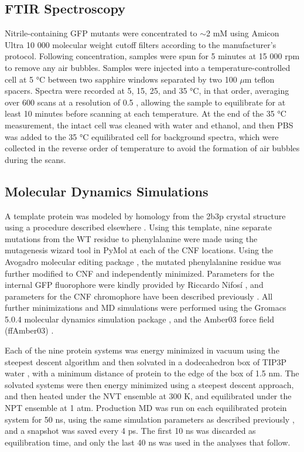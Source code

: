 \subsection{FTIR Spectroscopy}

Nitrile-containing GFP mutants were concentrated to $\sim$2 mM using Amicon Ultra 10 000 molecular weight cutoff filters according to the manufacturer's protocol.
Following concentration, samples were spun for 5 minutes at 15 000 rpm to remove any air bubbles.
Samples were injected into a temperature-controlled cell at 5 \si{\celsius} between two sapphire windows separated by two 100 $\mu$m teflon spacers.
Spectra were recorded at 5, 15, 25, and 35 \si{\celsius}, in that order, averaging over 600 scans at a resolution of 0.5 \si{\wn}, allowing the sample to equilibrate for at least 10 minutes before scanning at each temperature.
At the end of the 35 \si{\celsius} measurement, the intact cell was cleaned with water and ethanol, and then PBS was added to the 35 \si{\celsius} equilibrated cell for background spectra, which were collected in the reverse order of temperature to avoid the formation of air bubbles during the scans.

\subsection{Molecular Dynamics Simulations}

A template protein was modeled by homology from the 2b3p crystal structure\cite{Pedelacq2006} using a procedure described elsewhere \cite{Slocum2017}.
Using this template, nine separate mutations from the WT residue to phenylalanine were made using the mutagenesis wizard tool in PyMol\cite{DeLano2002} at each of the CNF locations.
Using the Avogadro molecular editing package \cite{Hanwell2012}, the mutated phenylalanine residue was further modified to CNF and independently minimized.
Parameters for the internal GFP fluorophore were kindly provided by Riccardo Nifos\'i \cite{Nifosi2003}, and parameters for the CNF chromophore have been described previously \cite{Slocum2017}.
All further minimizations and MD simulations were performed using the Gromacs 5.0.4 molecular dynamics simulation package \cite{VanDerSpoel2005, Abraham2015}, and the Amber03 force field (ffAmber03) \cite{Duan2003, Sorin2005}. 

Each of the nine protein systems was energy minimized in vacuum using the steepest descent algorithm and then solvated in a dodecahedron box of TIP3P water \cite{Jorgensen1983}, with a minimum distance of protein to the edge of the box of 1.5 nm.
The solvated systems were then energy minimized using a steepest descent approach, and then heated under the NVT ensemble at 300 K, and equilibrated under the NPT ensemble at 1 atm.
Production MD was run on each equilibrated protein system for 50 ns, using the same simulation parameters as described previously \cite{Slocum2017}, and a snapshot was saved every 4 ps.
The first 10 ns was discarded as equilibration time, and only the last 40 ns was used in the analyses that follow.

